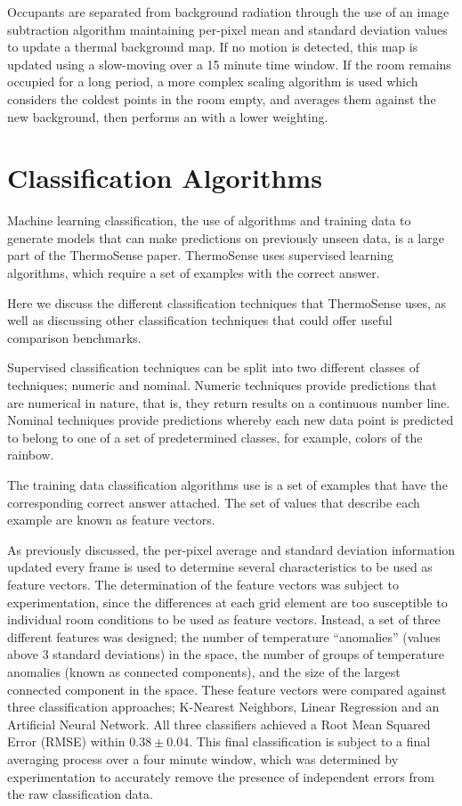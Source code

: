 \documentclass[../thesis/thesis.tex]{subfiles}
\begin{document}
Occupants are separated from background radiation through the use of an image subtraction algorithm maintaining per-pixel mean and standard deviation values to update a thermal background map. If no motion is detected, this map is updated using a slow-moving \emwa over a 15 minute time window. If the room remains occupied for a long period, a more complex scaling algorithm is used which considers the coldest points in the room empty, and averages them against the new background, then performs an \emwa with a lower weighting.

\section{Classification Algorithms}
\label{sec:classification}
Machine learning classification, the use of algorithms and training data to generate models that can make predictions on previously unseen data, is a large part of the ThermoSense paper. ThermoSense uses supervised learning algorithms, which require a set of examples with the correct answer.

Here we discuss the different classification techniques that ThermoSense uses, as well as discussing other classification techniques that could offer useful comparison benchmarks.

Supervised classification techniques can be split into two different classes of techniques; numeric and nominal. Numeric techniques provide predictions that are numerical in nature, that is, they return results on a continuous number line. Nominal techniques provide predictions whereby each new data point is predicted to belong to one of a set of predetermined classes, for example, colors of the rainbow.

The training data classification algorithms use is a set of examples that have the corresponding correct answer attached. The set of values that describe each example are known as feature vectors.

As previously discussed, the per-pixel average and standard deviation information updated every frame is used to determine several characteristics to be used as feature vectors. The determination of the feature vectors was subject to experimentation, since the differences at each grid element are too susceptible to individual room conditions to be used as feature vectors. Instead, a set of three different features was designed; the number of temperature ``anomalies'' (values above 3 standard deviations) in the space, the number of groups of temperature anomalies (known as connected components), and the size of the largest connected component in the space. These feature vectors were compared against three classification approaches; K-Nearest Neighbors, Linear Regression and an Artificial Neural Network. All three classifiers achieved a Root Mean Squared Error (RMSE) within $0.38\pm0.04$. This final classification is subject to a final averaging process over a four minute window, which was determined by experimentation to accurately remove the presence of independent errors from the raw classification data.
\end{document}
